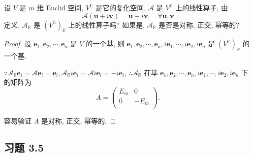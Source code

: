 \documentclass[color=black,device=normal,lang=cn,mode=geye]{elegantnote}
\begin{document}
\begin{exercise}%
    设 $V$ 是 $m$ 维 Euclid 空间, $V^\mathbb{C}$ 是它的复化空间, $\mathcal{A}$ 是 $V^\mathbb{C}$ 上的线性算子, 由
    \[\mathcal{A}(\boldsymbol{u}+i\boldsymbol{v})=\boldsymbol{u}-i\boldsymbol{v},\quad\forall\boldsymbol{u},\boldsymbol{v}\]
    定义. $\mathcal{A}_\mathbb{R}$ 是 $(V^\mathbb{C})_\mathbb{R}$ 上的线性算子吗? 如果是, $\mathcal{A}_\mathbb{R}$ 是否是对称, 正交, 幂等的?
\end{exercise}
\begin{proof}
    设 $\boldsymbol{e}_1,\boldsymbol{e}_2,\cdots,\boldsymbol{e}_n$ 是 $V$ 的一个基, 则 $\boldsymbol{e}_1,\boldsymbol{e}_2,\cdots,\boldsymbol{e}_n,i\boldsymbol{e}_1,\cdots,i\boldsymbol{e}_2,i\boldsymbol{e}_n$ 是 $(V^\mathbb{C})_\mathbb{R}$ 的一个基.

    $\because\mathcal{A}_\mathbb{R}\boldsymbol{e}_i=\mathcal{A}\boldsymbol{e}_i=\boldsymbol{e}_i,\mathcal{A}_\mathbb{R}i\boldsymbol{e}_i=\mathcal{A}i\boldsymbol{e}_i=-i\boldsymbol{e}_i$, $\therefore\mathcal{A}_\mathbb{R}$ 在基 $\boldsymbol{e}_1,\boldsymbol{e}_2,\cdots,\boldsymbol{e}_n,i\boldsymbol{e}_1,\cdots,i\boldsymbol{e}_2,i\boldsymbol{e}_n$ 下的矩阵为
    \[A=\begin{pmatrix}
        E_m & 0 \\
        0 & -E_m \\
    \end{pmatrix}.\]

    容易验证 $A$ 是对称, 正交, 幂等的.
\end{proof}
\subsection{习题 3.5}
\end{document}
